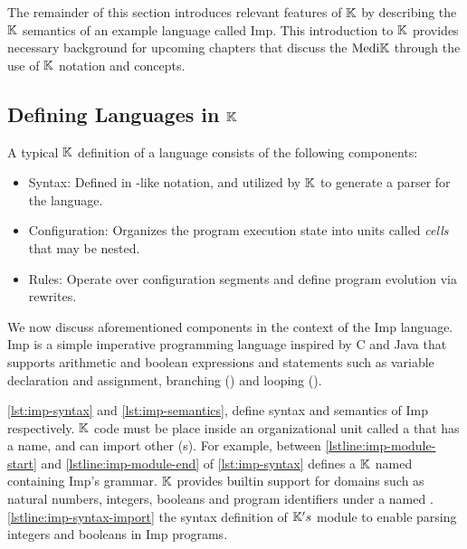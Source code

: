The remainder of this section introduces relevant features of
$\mathbb{K}{}$ by describing the $\mathbb{K}{}$ semantics of an example language called
Imp. This introduction to $\mathbb{K}{}$ provides necessary background
for upcoming chapters that discuss the $\text{Medi}\mathbb{K}{}{}$ \DSL{} through the
use of $\mathbb{K}{}$ notation and concepts.

\subsection{Defining Languages in $\mathbb{K}$}\label{sec:semantics-in-k}

A typical $\mathbb{K}$ definition of a language consists of the following components:
\begin{itemize}
  \item Syntax: Defined in \BNF{}-like notation, and utilized by $\mathbb{K}$
    to generate a parser for the language.
  \item Configuration: Organizes the program execution state
    into units called \emph{cells} that may be nested.
  \item Rules: Operate over configuration segments and define program
    evolution via rewrites.
\end{itemize}
We now discuss aforementioned components in the context of the Imp
language. Imp is a simple imperative programming language
inspired by C and Java that supports arithmetic and boolean expressions and
statements such as variable declaration and assignment, branching ()
and looping ().

\autoref{lst:imp-syntax} and \autoref{lst:imp-semantics},
define syntax and semantics of Imp respectively.
$\mathbb{K}{}$ code must be place inside an organizational unit called a
 that has a name, and can import other (s).
For example, 
between \autoref{lstline:imp-module-start} and
\autoref{lstline:imp-module-end} of \autoref{lst:imp-syntax} defines
a $\mathbb{K}{}$  named  containing Imp's
grammar. $\mathbb{K}{}$ provides builtin support for domains such as natural
numbers, integers, booleans and program identifiers
under a  named .
\autoref{lstline:imp-syntax-import} 
the syntax definition of $\mathbb{K}{}'s$  module
to enable parsing integers and booleans in Imp programs.

